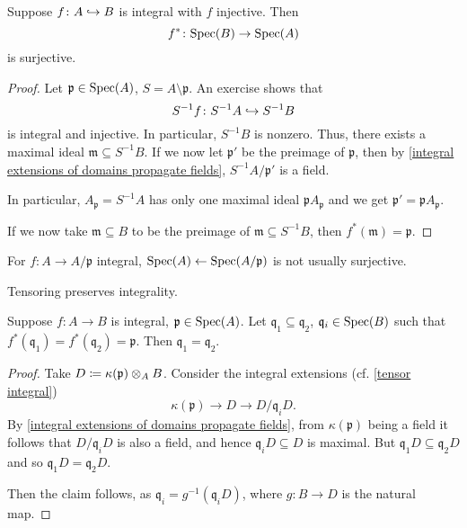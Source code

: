 \begin{prop}
  Suppose $f \colon A \hookrightarrow B$ is integral with $f$ injective. Then
  \[ f^* \colon \text{Spec}(B) \to \text{Spec}(A)\]
  is surjective.
\end{prop}
\begin{proof}
  Let $\mathfrak p \in \text{Spec}(A)$, $S = A \setminus \mathfrak p$. An exercise shows that
  \[ S^{-1} f \colon S^{-1} A \hookrightarrow S^{-1}B\]
  is integral and injective.
  In particular, $S^{-1}B$ is nonzero.
  Thus, there exists a maximal ideal $\mathfrak m \subseteq S^{-1}B$. If we now let $\mathfrak p'$ be the preimage of $\mathfrak p$, then by \cref{integral extensions of domains propagate fields}, $S^{-1}A /{\mathfrak p'}$ is a field.

  In particular, $A_{\mathfrak p} = S^{-1}A$ has only one maximal ideal $\mathfrak p A_{\mathfrak p}$ and we get $\mathfrak p' = \mathfrak p A_{\mathfrak p}$.

  If we now take $\mathfrak m \subseteq B$ to be the preimage of $\mathfrak m \subseteq S^{-1}B$, then $f^*(\mathfrak m) = \mathfrak p$.
\end{proof}

\begin{note}
  For $f \colon A \to A/{\mathfrak p}$ integral, $\text{Spec}(A) \leftarrow \text{Spec}(A/{\mathfrak p})$ is not usually surjective.
\end{note}

\begin{prop}
  \label{tensor integral}
  Tensoring preserves integrality.
\end{prop}

\begin{prop}[incomparability]
  Suppose $f \colon A \to B$ is integral, $\mathfrak p \in \text{Spec}(A)$. Let $\mathfrak q_1 \subseteq \mathfrak q_2$, $\mathfrak q_i \in \text{Spec}(B)$ such that $f^*(\mathfrak q_1) = f^*(\mathfrak q_2) = \mathfrak p$. Then $\mathfrak q_1 = \mathfrak q_2$.
\end{prop}
\begin{proof}
  Take $D \coloneqq \kappa(\mathfrak p) \otimes_A B$. Consider the integral extensions (cf. \cref{tensor integral})
  \[ \kappa(\mathfrak p) \to D \to D/{\mathfrak q_i D}.\]
  By \cref{integral extensions of domains propagate fields}, from $\kappa(\mathfrak p)$ being a field it follows that $D/{\mathfrak q_i D}$ is also a field, and hence $\mathfrak q_i D \subseteq D$ is maximal. But $\mathfrak q_1 D \subseteq \mathfrak q_2 D$ and so $\mathfrak q_1 D = \mathfrak q_2 D$.

  Then the claim follows, as $\mathfrak q_i = g^{-1}(\mathfrak q_i D)$, where $g \colon B \to D$ is the natural map.
\end{proof}


